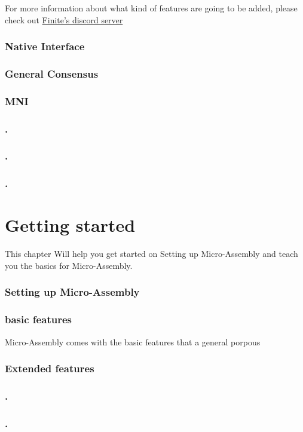 \documentclass[a4paper,11pt]{book}
\begin{document}
For more information about what kind of features are going to be added, please check out
\hyperref{https://discord.finite.ovh}{}{}{Finite's discord server}

\subsection{Native Interface}
\subsection{General Consensus}
\subsection{MNI}\label{subpar:MNI}
\subsection{.}
\subsection{.}
\subsection{.}

\chapter{Getting started}
This chapter Will help you get started on Setting up Micro-Assembly and teach you the basics for Micro-Assembly.
\subsection{Setting up Micro-Assembly}\label{setup:masm}
\subsection{basic features}
Micro-Assembly comes with the basic features that a general porpous	
\subsection{Extended features}
\subsection{.}
\subsection{.}
\end{document}
